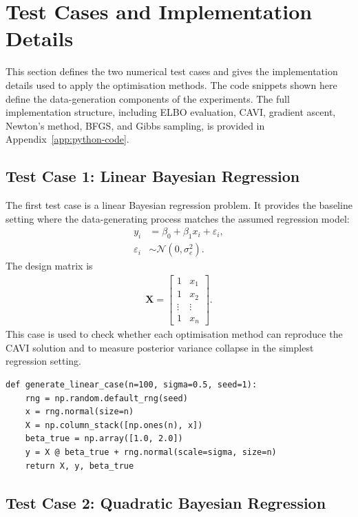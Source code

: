 \documentclass[11pt,a4paper]{article}
\newcommand{\N}{\mathcal{N}}
\begin{document}
\section{Test Cases and Implementation Details}
\label{sec:implementation-details}

This section defines the two numerical test cases and gives the implementation details used to apply the optimisation methods. The code snippets shown here define the data-generation components of the experiments. The full implementation structure, including ELBO evaluation, CAVI, gradient ascent, Newton's method, BFGS, and Gibbs sampling, is provided in Appendix~\ref{app:python-code}.

\subsection{Test Case 1: Linear Bayesian Regression}

The first test case is a linear Bayesian regression problem. It provides the baseline setting where the data-generating process matches the assumed regression model:
\begin{align}
y_i &= \beta_0 + \beta_1 x_i + \varepsilon_i,\\
\varepsilon_i &\sim \N(0,\sigma_e^2).
\end{align}
The design matrix is
\begin{align}
\bm{X} =
\begin{bmatrix}
1 & x_1\\
1 & x_2\\
\vdots & \vdots\\
1 & x_n
\end{bmatrix}.
\end{align}
This case is used to check whether each optimisation method can reproduce the CAVI solution and to measure posterior variance collapse in the simplest regression setting.

\begin{verbatim}
def generate_linear_case(n=100, sigma=0.5, seed=1):
    rng = np.random.default_rng(seed)
    x = rng.normal(size=n)
    X = np.column_stack([np.ones(n), x])
    beta_true = np.array([1.0, 2.0])
    y = X @ beta_true + rng.normal(scale=sigma, size=n)
    return X, y, beta_true
\end{verbatim}

\subsection{Test Case 2: Quadratic Bayesian Regression}
\end{document}
